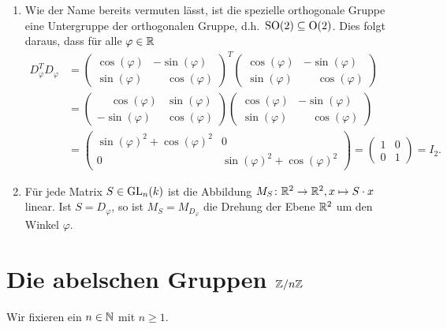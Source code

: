 \begin{bem}
 \begin{enumerate}[leftmargin=*]
  \item
   Wie der Name bereits vermuten lässt, ist die spezielle orthogonale Gruppe eine Untergruppe der orthogonalen Gruppe, d.h.\ $\mathrm{SO}(2) \subseteq \mathrm{O}(2)$. Dies folgt daraus, dass für alle $\varphi \in \mathbb{R}$
   \begin{align*}
    D_\varphi^T D_\varphi
    &=
    \begin{pmatrix}
     \cos(\varphi) &           -\sin(\varphi) \\
     \sin(\varphi) & \phantom{-}\cos(\varphi)
    \end{pmatrix}^T
    \begin{pmatrix}
     \cos(\varphi) &           -\sin(\varphi) \\
     \sin(\varphi) & \phantom{-}\cos(\varphi)
    \end{pmatrix} \\
    &=
    \begin{pmatrix}
     \phantom{-}\cos(\varphi) & \sin(\varphi) \\
               -\sin(\varphi) & \cos(\varphi)
    \end{pmatrix}
    \begin{pmatrix}
     \cos(\varphi) & -\sin(\varphi) \\
     \sin(\varphi) & \phantom{-}\cos(\varphi)
    \end{pmatrix} \\
    &=
    \begin{pmatrix}
     \sin(\varphi)^2 + \cos(\varphi)^2 & 0 \\
     0 & \sin(\varphi)^2 + \cos(\varphi)^2
    \end{pmatrix}
    =
    \begin{pmatrix}
     1 & 0 \\
     0 & 1
    \end{pmatrix}
    = I_2.
   \end{align*}
  \item
   Für jede Matrix $S \in \mathrm{GL}_n(k)$ ist die Abbildung $M_S \colon \mathbb{R}^2 \to \mathbb{R}^2, x \mapsto S \cdot x$ linear. Ist $S = D_\varphi$, so ist $M_S = M_{D_\varphi}$ die Drehung der Ebene $\mathbb{R}^2$ um den Winkel $\varphi$.
 \end{enumerate}
\end{bem}





\section{Die abelschen Gruppen \texorpdfstring{$\mathbb{Z}/n\mathbb{Z}$}{Z/nZ}}\label{ss: ZnZ}
Wir fixieren ein $n \in \mathbb{N}$ mit $n \geq 1$.



